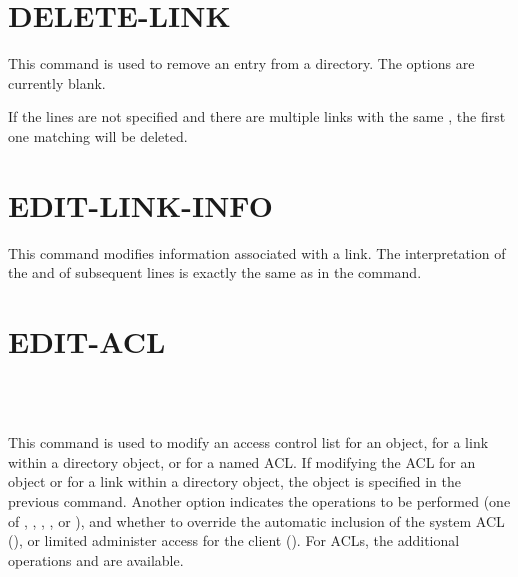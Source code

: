 \section{DELETE-LINK}

\begin{command}
  \commandsize
     \selectlines
\end{command}

This command is used to remove an entry from a directory.  The options
are currently blank.

If the  lines are not specified and there are multiple
links with the same , the first one matching will
be deleted.

\section{EDIT-LINK-INFO}

\begin{command}
  \commandsize
     
	\zoos{}  \zooe  
\end{command}

\begin{sloppypar}
This command modifies information associated with a link.
The interpretation of the %
 and of
subsequent lines is exactly the same as in the  command.
\end{sloppypar}


\section{EDIT-ACL}

\begin{command}
\commandsize
{}
 \ors {}  \\
	\hspace{.6in} \metaor {} \ore	\\
     
\end{command}

This command is used to modify an access control list for an object,
for a link within a directory object, or for a named ACL.  If modifying the ACL
for an object or for a link within a directory object, the object is
specified in the previous  command.
Another option indicates the operations to be
performed (one of , , , ,  or ), and
whether to override the automatic inclusion of the system
ACL (), or limited administer access for the client
().  For  ACLs, the additional operations
 and  are available.

